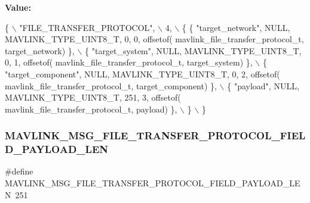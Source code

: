 {\bfseries Value\+:}
\begin{DoxyCode}
\{ \(\backslash\)
    \textcolor{stringliteral}{"FILE\_TRANSFER\_PROTOCOL"}, \(\backslash\)
    4, \(\backslash\)
    \{  \{ \textcolor{stringliteral}{"target\_network"}, NULL, MAVLINK_TYPE_UINT8_T, 0, 0, offsetof(
      mavlink_file_transfer_protocol_t, target\_network) \}, \(\backslash\)
         \{ \textcolor{stringliteral}{"target\_system"}, NULL, MAVLINK_TYPE_UINT8_T, 0, 1, offsetof(
      mavlink_file_transfer_protocol_t, target\_system) \}, \(\backslash\)
         \{ \textcolor{stringliteral}{"target\_component"}, NULL, MAVLINK_TYPE_UINT8_T, 0, 2, offsetof(
      mavlink_file_transfer_protocol_t, target\_component) \}, \(\backslash\)
         \{ \textcolor{stringliteral}{"payload"}, NULL, MAVLINK_TYPE_UINT8_T, 251, 3, offsetof(
      mavlink_file_transfer_protocol_t, payload) \}, \(\backslash\)
         \} \(\backslash\)
\}
\end{DoxyCode}
\mbox{\label{mavlink__msg__file__transfer__protocol_8h_a6ae79fc80010d5093122e1dc0a3c6f08}} 
\subsubsection{M\+A\+V\+L\+I\+N\+K\+\_\+\+M\+S\+G\+\_\+\+F\+I\+L\+E\+\_\+\+T\+R\+A\+N\+S\+F\+E\+R\+\_\+\+P\+R\+O\+T\+O\+C\+O\+L\+\_\+\+F\+I\+E\+L\+D\+\_\+\+P\+A\+Y\+L\+O\+A\+D\+\_\+\+L\+EN}
{\footnotesize\ttfamily \#define M\+A\+V\+L\+I\+N\+K\+\_\+\+M\+S\+G\+\_\+\+F\+I\+L\+E\+\_\+\+T\+R\+A\+N\+S\+F\+E\+R\+\_\+\+P\+R\+O\+T\+O\+C\+O\+L\+\_\+\+F\+I\+E\+L\+D\+\_\+\+P\+A\+Y\+L\+O\+A\+D\+\_\+\+L\+EN~251}


